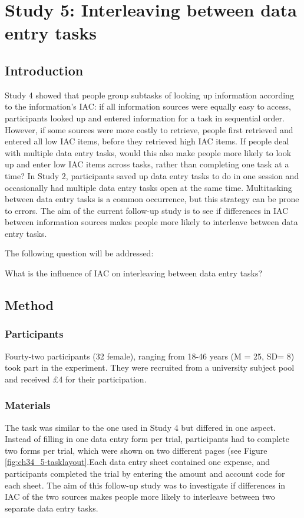 \section{Study 5: Interleaving between data entry tasks}
 
\subsection{Introduction}
Study 4 showed that people group subtasks of looking up information according to the information's IAC: if all information sources were equally easy to access, participants looked up and entered information for a task in sequential order. However, if some sources were more costly to retrieve, people first retrieved and entered all low IAC items, before they retrieved high IAC items.
If people deal with multiple data entry tasks, would this also make people more likely to look up and enter low IAC items across tasks, rather than completing one task at a time? 
In Study 2, participants saved up data entry tasks to do in one session and occasionally had multiple data entry tasks open at the same time. Multitasking between data entry tasks is a common occurrence, but this strategy can be prone to errors.
The aim of the current follow-up study is to see if differences in IAC between information sources makes people more likely to interleave between data entry tasks.

The following question will be addressed:

What is the influence of IAC on interleaving between data entry tasks?

\subsection{Method}
\subsubsection{Participants}
Fourty-two participants (32 female), ranging from 18-46 years (M = 25, SD= 8) took part in the experiment. They were recruited from a university subject pool and received $\pounds$4 for their participation.

\subsubsection{Materials}
The task was similar to the one used in Study 4 but differed in one aspect. Instead of filling in one data entry form per trial, participants had to complete two forms per trial, which were shown on two different pages (see Figure \ref{fig:ch34_5-tasklayout}.Each data entry sheet contained one expense, and participants completed the trial by entering the amount and account code for each sheet. The aim of this follow-up study was to investigate if differences in IAC of the two sources makes people more likely to interleave between two separate data entry tasks.

